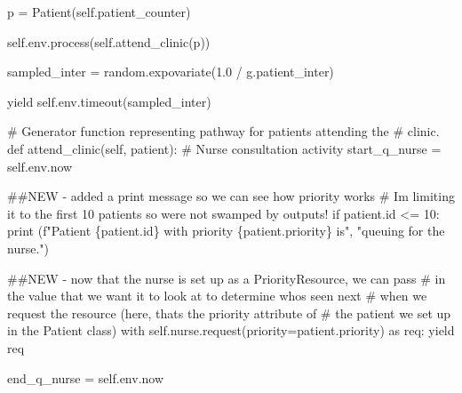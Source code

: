 \documentclass[
  letterpaper,
  DIV=11,
  numbers=noendperiod]{scrreprt}
\newenvironment{Shaded}{}{}
\newcommand{\BuiltInTok}[1]{\textcolor[rgb]{0.84,0.23,0.29}{#1}}
\newcommand{\CommentTok}[1]{\textcolor[rgb]{0.42,0.45,0.49}{#1}}
\newcommand{\ControlFlowTok}[1]{\textcolor[rgb]{0.84,0.23,0.29}{#1}}
\newcommand{\DecValTok}[1]{\textcolor[rgb]{0.00,0.36,0.77}{#1}}
\newcommand{\FloatTok}[1]{\textcolor[rgb]{0.00,0.36,0.77}{#1}}
\newcommand{\ImportTok}[1]{\textcolor[rgb]{0.01,0.18,0.38}{#1}}
\newcommand{\KeywordTok}[1]{\textcolor[rgb]{0.84,0.23,0.29}{#1}}
\newcommand{\NormalTok}[1]{\textcolor[rgb]{0.14,0.16,0.18}{#1}}
\newcommand{\OperatorTok}[1]{\textcolor[rgb]{0.14,0.16,0.18}{#1}}
\newcommand{\SpecialCharTok}[1]{\textcolor[rgb]{0.00,0.36,0.77}{#1}}
\newcommand{\SpecialStringTok}[1]{\textcolor[rgb]{0.01,0.18,0.38}{#1}}
\newcommand{\StringTok}[1]{\textcolor[rgb]{0.01,0.18,0.38}{#1}}
\newcommand{\VariableTok}[1]{\textcolor[rgb]{0.89,0.38,0.04}{#1}}
\begin{document}
\begin{tcolorbox}
\begin{Shaded}
\begin{Highlighting}[]
\NormalTok{            p }\OperatorTok{=}\NormalTok{ Patient(}\VariableTok{self}\NormalTok{.patient\_counter)}

            \VariableTok{self}\NormalTok{.env.process(}\VariableTok{self}\NormalTok{.attend\_clinic(p))}

\NormalTok{            sampled\_inter }\OperatorTok{=}\NormalTok{ random.expovariate(}\FloatTok{1.0} \OperatorTok{/}\NormalTok{ g.patient\_inter)}

            \ControlFlowTok{yield} \VariableTok{self}\NormalTok{.env.timeout(sampled\_inter)}

    \CommentTok{\# Generator function representing pathway for patients attending the}
    \CommentTok{\# clinic.}
    \KeywordTok{def}\NormalTok{ attend\_clinic(}\VariableTok{self}\NormalTok{, patient):}
        \CommentTok{\# Nurse consultation activity}
\NormalTok{        start\_q\_nurse }\OperatorTok{=} \VariableTok{self}\NormalTok{.env.now}

        \CommentTok{\#\#NEW {-} added a print message so we can see how priority works}
        \CommentTok{\# I\textquotesingle{}m limiting it to the first 10 patients so we\textquotesingle{}re not swamped by outputs!}
        \ControlFlowTok{if}\NormalTok{ patient.}\BuiltInTok{id} \OperatorTok{\textless{}=} \DecValTok{10}\NormalTok{:}
            \BuiltInTok{print}\NormalTok{ (}\SpecialStringTok{f"Patient }\SpecialCharTok{\{}\NormalTok{patient}\SpecialCharTok{.}\BuiltInTok{id}\SpecialCharTok{\}}\SpecialStringTok{ with priority }\SpecialCharTok{\{}\NormalTok{patient}\SpecialCharTok{.}\NormalTok{priority}\SpecialCharTok{\}}\SpecialStringTok{ is"}\NormalTok{,}
                \StringTok{"queuing for the nurse."}\NormalTok{)}

        \CommentTok{\#\#NEW {-} now that the nurse is set up as a PriorityResource, we can pass}
        \CommentTok{\# in the value that we want it to look at to determine who\textquotesingle{}s seen next}
        \CommentTok{\# when we request the resource (here, that\textquotesingle{}s the priority attribute of}
        \CommentTok{\# the patient we set up in the Patient class)}
        \ControlFlowTok{with} \VariableTok{self}\NormalTok{.nurse.request(priority}\OperatorTok{=}\NormalTok{patient.priority) }\ImportTok{as}\NormalTok{ req:}
            \ControlFlowTok{yield}\NormalTok{ req}

\NormalTok{            end\_q\_nurse }\OperatorTok{=} \VariableTok{self}\NormalTok{.env.now}


\end{Highlighting}
\end{Shaded}
\end{tcolorbox}
\end{document}
